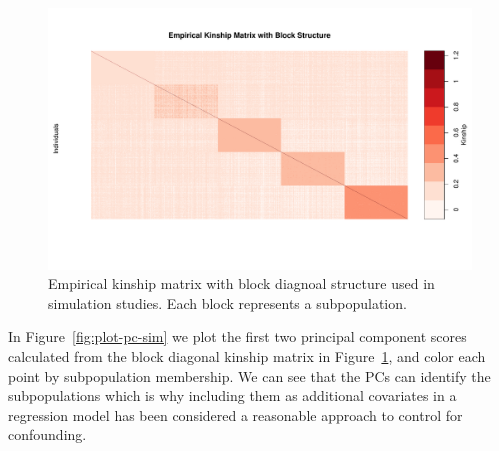 \documentclass[12pt,letter]{article}\usepackage[]{graphicx}\usepackage[]{color}
\newenvironment{knitrout}{}{} %
\begin{document}
\begin{knitrout}\scriptsize
{}\color{fgcolor}\begin{figure}[H]

{\centering \includegraphics[width=1\linewidth]{figure/plot-kinship-sim-1} 

}

\caption[Empirical kinship matrix with block diagnoal structure used in simulation studies]{Empirical kinship matrix with block diagnoal structure used in simulation studies. Each block represents a subpopulation. }\label{fig:plot-kinship-sim}
\end{figure}


\end{knitrout}

In Figure~\ref{fig:plot-pc-sim} we plot the first two principal component scores calculated from the block diagonal kinship matrix in Figure~\ref{fig:plot-kinship-sim}, and color each point by subpopulation membership. We can see that the PCs can identify the subpopulations which is why including them as additional covariates in a regression model has been considered a reasonable approach to control for confounding.
\end{document}
